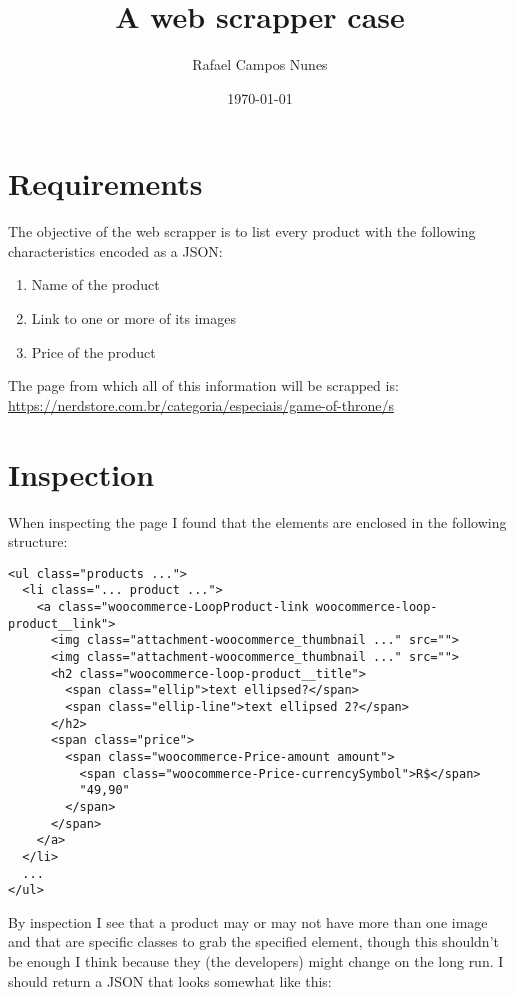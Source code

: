 \documentclass[a4paper, 12pt]{article}
\author{Rafael Campos Nunes}
\date{\today}
\title{A web scrapper case}
\begin{document}
\maketitle

\section{Requirements}
\label{sec:org262e059}

The objective of the web scrapper is to list every product with the following
characteristics encoded as a JSON:

\begin{enumerate}
\item Name of the product
\item Link to one or more of its images
\item Price of the product
\end{enumerate}

The page from which all of this information will be scrapped is:
\url{https://nerdstore.com.br/categoria/especiais/game-of-throne/s}

\section{Inspection}
\label{sec:org7c477e2}

When inspecting the page I found that the elements are enclosed in the following
structure:

\begin{verbatim}
<ul class="products ...">
  <li class="... product ...">
    <a class="woocommerce-LoopProduct-link woocommerce-loop-product__link">
      <img class="attachment-woocommerce_thumbnail ..." src="">
      <img class="attachment-woocommerce_thumbnail ..." src="">
      <h2 class="woocommerce-loop-product__title">
        <span class="ellip">text ellipsed?</span>
        <span class="ellip-line">text ellipsed 2?</span>
      </h2>
      <span class="price">
        <span class="woocommerce-Price-amount amount">
          <span class="woocommerce-Price-currencySymbol">R$</span>
          "49,90"
        </span>
      </span>
    </a>
  </li>
  ...
</ul>
\end{verbatim}

By inspection I see that a product may or may not have more than one image and
that are specific classes to grab the specified element, though this shouldn't
be enough I think because they (the developers) might change on the long run. I
should return a JSON that looks somewhat like this:
\end{document}
